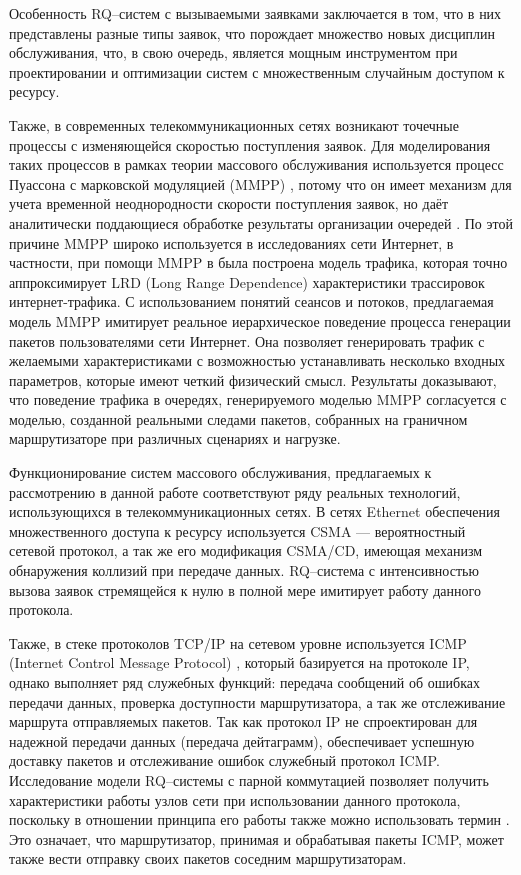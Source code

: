 Особенность RQ--систем с вызываемыми заявками заключается в том, что в них представлены разные типы заявок, что порождает множество новых дисциплин обслуживания, что, в свою очередь, является мощным инструментом при проектировании и оптимизации систем с множественным случайным доступом к ресурсу.

Также, в современных телекоммуникационных сетях возникают точечные процессы с изменяющейся скоростью поступления заявок. Для моделирования таких процессов в рамках теории массового обслуживания используется процесс Пуассона с марковской модуляцией (MMPP) \cite{baiocchi1993steady,2019asymptotic}, потому что он имеет механизм для учета временной неоднородности скорости поступления заявок, но даёт аналитически поддающиеся обработке результаты организации очередей \cite{meier1987fitting}. По этой причине MMPP широко используется в исследованиях сети Интернет, в частности, при помощи MMPP в  \cite{muscariello2004mmpp} была построена модель трафика, которая точно аппроксимирует LRD (Long Range Dependence) характеристики трассировок интернет-трафика. С использованием понятий сеансов и потоков, предлагаемая модель MMPP имитирует реальное иерархическое поведение процесса генерации пакетов пользователями сети Интернет. Она позволяет генерировать трафик с желаемыми характеристиками с возможностью устанавливать несколько входных параметров, которые имеют четкий физический смысл. Результаты доказывают, что поведение трафика в очередях, генерируемого моделью MMPP согласуется с моделью, созданной реальными следами пакетов, собранных на граничном маршрутизаторе при различных сценариях и нагрузке.

Функционирование систем массового обслуживания, предлагаемых к рассмотрению в данной работе соответствуют ряду реальных технологий, использующихся в телекоммуникационных сетях. В сетях Ethernet обеспечения множественного доступа к ресурсу используется CSMA \cite{christensen2010ieee,nutt1982performance} --- вероятностный сетевой протокол, а так же его модификация CSMA/CD, имеющая механизм обнаружения коллизий при передаче данных. RQ--система с интенсивностью вызова заявок стремящейся к нулю в полной мере имитирует работу данного протокола.

Также, в стеке протоколов TCP/IP на сетевом уровне используется ICMP (Internet Control Message Protocol) \cite{bellovin2003icmp}, который базируется на протоколе IP, однако выполняет ряд служебных функций: передача сообщений об ошибках передачи данных, проверка доступности маршрутизатора, а так же отслеживание маршрута отправляемых пакетов. Так как протокол IP не спроектирован для надежной передачи данных (передача дейтаграмм), обеспечивает успешную доставку пакетов и отслеживание ошибок служебный протокол ICMP. Исследование модели RQ--системы с парной коммутацией позволяет получить характеристики работы узлов сети при использовании данного протокола, поскольку в отношении принципа его работы также можно использовать термин . Это означает, что маршрутизатор, принимая и обрабатывая пакеты ICMP, может также вести отправку своих пакетов соседним маршрутизаторам. 

